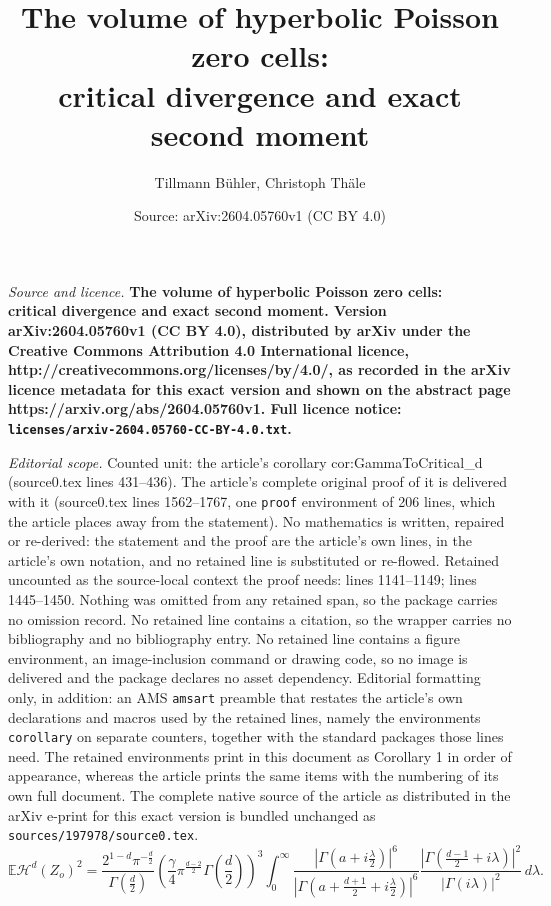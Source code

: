 \documentclass[10pt,a4paper]{amsart}
\title{\bfseries The volume of hyperbolic Poisson zero cells:\\ critical divergence and exact second moment}
\author{Tillmann B\"uhler, Christoph Th\"ale}
\date{Source: arXiv:2604.05760v1 (CC BY 4.0)}
\def\EE{\mathbb{E}}
\def\cH{\mathcal{H}}
\begin{document}
\maketitle

\noindent\emph{Source and licence.} \bfseries The volume of hyperbolic Poisson zero cells:\\ critical divergence and exact second moment. Version arXiv:2604.05760v1 (CC BY 4.0), distributed by arXiv under the Creative Commons Attribution 4.0 International licence, http://creativecommons.org/licenses/by/4.0/, as recorded in the arXiv licence metadata for this exact version and shown on the abstract page https://arxiv.org/abs/2604.05760v1. Full licence notice: \texttt{licenses/arxiv-2604.05760-CC-BY-4.0.txt}.\par\smallskip

\noindent\textit{Editorial scope.} Counted unit: the article's corollary cor:GammaToCritical\_d (source0.tex lines 431--436). The article's complete original proof of it is delivered with it (source0.tex lines 1562--1767, one \texttt{proof} environment of 206 lines, which the article places away from the statement). No mathematics is written, repaired or re-derived: the statement and the proof are the article's own lines, in the article's own notation, and no retained line is substituted or re-flowed.  Retained uncounted as the source-local context the proof needs: lines 1141--1149; lines 1445--1450.  Nothing was omitted from any retained span, so the package carries no omission record.  No retained line contains a citation, so the wrapper carries no bibliography and no bibliography entry.  No retained line contains a figure environment, an image-inclusion command or drawing code, so no image is delivered and the package declares no asset dependency.  Editorial formatting only, in addition: an AMS \texttt{amsart} preamble that restates the article's own declarations and macros used by the retained lines, namely the environments \texttt{corollary} on separate counters, together with the standard packages those lines need.  The retained environments print in this document as Corollary 1 in order of appearance, whereas the article prints the same items with the numbering of its own full document.  The complete native source of the article as distributed in the arXiv e-print for this exact version is bundled unchanged as \texttt{sources/197978/source0.tex}.
\begin{equation}\label{eq:SecondMomentIntermediate_d}
	\EE\cH^d(Z_o)^2
	= \frac{2^{1-d} \pi^{-\frac{d}{2}}}{\Gamma\left(\frac{d}{2}\right)} \left( \frac{\gamma}{4} \pi^{\frac{d-2}{2}} \Gamma\left(\frac{d}{2}\right) \right)^3
	\int_0^\infty
	\frac{\left| \Gamma\left(a + i\frac{\lambda}{2}\right) \right|^6}{
		\left| \Gamma\left(a + \frac{d+1}{2} + i\frac{\lambda}{2}\right) \right|^6}
	\frac{\left| \Gamma\left(\frac{d-1}{2} + i\lambda\right) \right|^2}{\left| \Gamma(i\lambda) \right|^2}
	\, d\lambda.
\end{equation}
\end{document}
